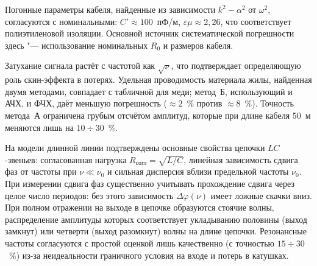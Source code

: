 \documentclass[a4paper,12pt]{article}
\begin{document}
Погонные параметры кабеля, найденные из
зависимости $k^2-\alpha^2$ от $\omega^2$, согласуются с номинальными:
$C'\approx100$~пФ/м, $\varepsilon\mu\approx2{,}26$, что соответствует
полиэтиленовой изоляции. Основной источник систематической
погрешности здесь "--- использование номинальных $R_0$ и размеров
кабеля.

Затухание сигнала растёт с частотой как $\sqrt\nu$, что подтверждает
определяющую роль скин-эффекта в потерях. Удельная проводимость
материала жилы, найденная двумя методами, совпадает с табличной для
меди; метод~Б, использующий и АЧХ, и ФЧХ, даёт меньшую погрешность
($\approx2$~\% против $\approx8$~\%). Точность метода~А ограничена
грубым отсчётом амплитуд, которые при длине кабеля 50~м меняются лишь
на $10\div30$~\%.

На модели длинной линии подтверждены основные свойства цепочки
$LC$-звеньев: согласованная нагрузка $R_\text{согл} = \sqrt{L/C}$,
линейная зависимость сдвига фаз от частоты при $\nu\ll\nu_0$ и
сильная дисперсия вблизи предельной частоты $\nu_0$. При измерении
сдвига фаз существенно учитывать прохождение сдвига через целое число
периодов: без этого зависимость $\Delta\varphi(\nu)$ имеет ложные
скачки вниз. При полном отражении на выходе в цепочке образуются стоячие
волны, распределение амплитуды которых соответствует укладыванию
половины (выход замкнут) или четверти (выход разомкнут) волны на длине
цепочки. Резонансные частоты согласуются с простой оценкой лишь
качественно (с точностью $15\div30$~\%) из-за неидеальности граничного
условия на входе и потерь в катушках.
\end{document}
